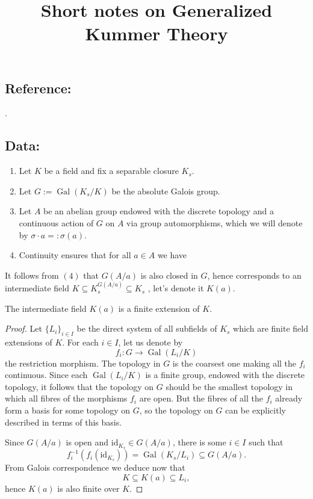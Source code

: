 \documentclass[12pt]{amsart}
\DeclareMathOperator{\Gal}{Gal}
\newcommand{\id}{\mathrm{id}}
\begin{document}
\title{Short notes on Generalized Kummer Theory}
\maketitle

\subsection{Reference:} \cite[\S 4.10]{bos18}.

\subsection{Data:}
\begin{enumerate}
    \item Let $K$ be a field and fix a separable closure $K_{s}$.
    \item Let $G:=\Gal(K_{s}/K)$ be the absolute Galois group.
    \item Let $A$ be an abelian group endowed with the discrete topology and a continuous action of $G$ on $A$ via group automorphisms, which we will denote by $\sigma \cdot a=:\sigma(a)$.
    \item Continuity ensures that for all $a\in A$ we have
	\begin{center}
	\end{center}
\end{enumerate}

It follows from $(4)$ that $G(A/a)$ is also closed in $G$, hence corresponds to an intermediate field $K\subseteq K_{s}^{G(A/a)}\subseteq K_{s}$ \cite[4.2/3]{bos18}, let's denote it $K(a)$.

\begin{lm}
    The intermediate field $K(a)$ is a finite extension of $K$.
    \begin{proof}
	Let $\{ L_{i} \}_{i\in I}$ be the direct system of all subfields of $K_{s}$ which are finite field extensions of $K$.
	For each $i\in I$, let us denote by
	\[ f_{i}\colon G\to \Gal(L_{i}/K) \]
	the restriction morphism.
	The topology in $G$ is the coarsest one making all the $f_{i}$ continuous.
	Since each $\Gal(L_{i}/K)$ is a finite group, endowed with the discrete topology, it follows that the topology on $G$ should be the smallest topology in which all fibres of the morphisms $f_{i}$ are open.
	But the fibres of all the $f_{i}$ already form a basis for some topology on $G$, so the topology on $G$ can be explicitly described in terms of this basis.

	Since $G(A/a)$ is open and $\id_{K_{s}}\in G(A/a)$, there is some $i\in I$ such that
	\[ f_{i}^{-1}(f_{i}(\id_{K_{s}}))=\Gal(K_{s}/L_{i})\subseteq G(A/a). \]
	From Galois correspondence we deduce now that
	\[ K\subseteq K(a)\subseteq L_{i}, \]
	hence $K(a)$ is also finite over $K$.
    \end{proof}
\end{lm}

\newpage


\vfill
\end{document}
